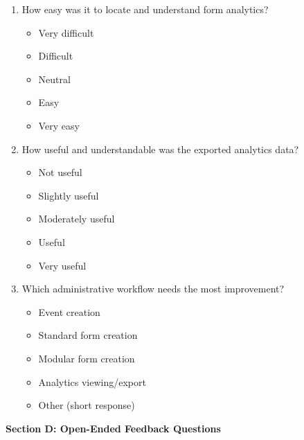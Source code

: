 \documentclass[12pt]{article}
\begin{document}
\begin{enumerate}
\begin{itemize}[label=$\circ$]
        \item Neutral
        \item Easy
        \item Very easy
    \end{itemize}
    \item How easy was it to locate and understand form analytics?
    \begin{itemize}[label=$\circ$]
        \item Very difficult
        \item Difficult
        \item Neutral
        \item Easy
        \item Very easy
    \end{itemize}
    \item How useful and understandable was the exported analytics data?
    \begin{itemize}[label=$\circ$]
        \item Not useful
        \item Slightly useful
        \item Moderately useful
        \item Useful
        \item Very useful
    \end{itemize}
    \item Which administrative workflow needs the most improvement?
    \begin{itemize}[label=$\circ$]
        \item Event creation
        \item Standard form creation
        \item Modular form creation
        \item Analytics viewing/export
        \item Other (short response)
    \end{itemize}
\end{enumerate}
\textbf{Section D: Open-Ended Feedback Questions}
\end{document}
